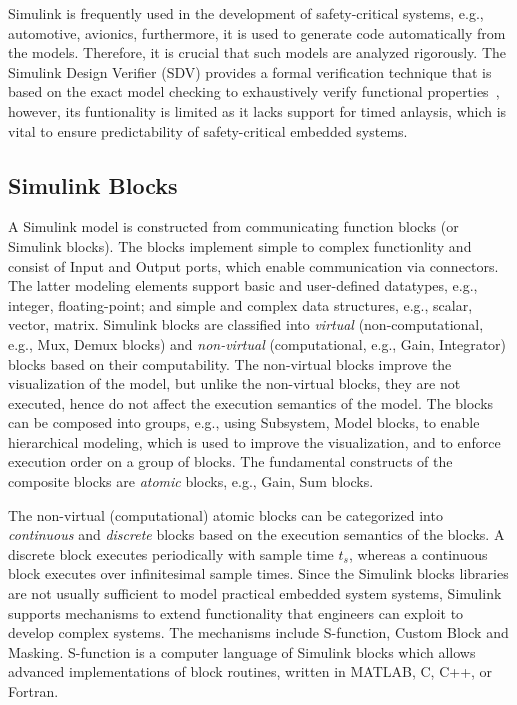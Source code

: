 Simulink is frequently used in the development of safety-critical systems, e.g., automotive, avionics, furthermore, it is used to generate code automatically from the models. Therefore, it is crucial that such models are analyzed rigorously. The Simulink Design Verifier (SDV) provides a formal verification technique that is based on the exact model checking to exhaustively verify functional properties~\cite{MathWokrksSimulinkVerifier}, however, its funtionality is limited as it lacks support for timed anlaysis, which is vital to ensure predictability of safety-critical embedded systems. 

\subsection*{Simulink Blocks}
A Simulink model is constructed from communicating function blocks (or Simulink blocks). The blocks implement simple to complex functionlity and consist of Input and Output ports, which enable communication via connectors. The latter modeling elements support basic and user-defined datatypes, e.g., integer, floating-point; and simple and complex data structures, e.g., scalar, vector, matrix.  Simulink blocks are classified into \textit{virtual} (non-computational, e.g., Mux, Demux blocks) and \textit{non-virtual} (computational, e.g., Gain, Integrator) blocks based on their computability. The non-virtual blocks improve the visualization of the model, but unlike the non-virtual blocks, they are not executed, hence do not affect the execution semantics of the model.  The blocks can be composed into groups, e.g., using Subsystem, Model blocks, to enable hierarchical modeling, which is used to improve the visualization, and to enforce execution order on a group of blocks. The fundamental constructs of the composite blocks are \textit{atomic} blocks, e.g., Gain, Sum blocks.

The non-virtual (computational) atomic blocks can be categorized into \textit{continuous} and \textit{discrete} blocks based on the execution semantics of the blocks.  A discrete block executes periodically with sample time $t_s$, whereas a continuous block executes over infinitesimal sample times. Since the Simulink blocks libraries are not usually sufficient to model practical embedded system systems, Simulink supports mechanisms to extend functionality that engineers can exploit to develop complex systems. The mechanisms include S-function, Custom Block and Masking. S-function is a computer language of Simulink blocks which allows advanced implementations of block routines, written in MATLAB, C, C++, or Fortran.


